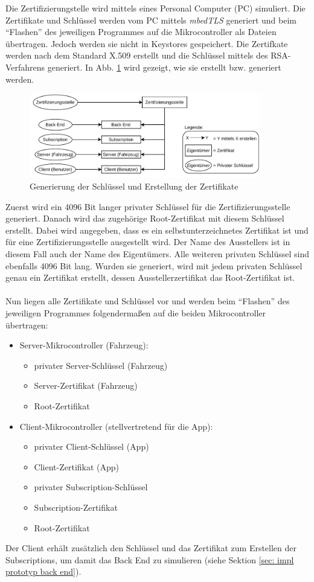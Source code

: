 Die Zertifizierungstelle wird mittels eines Personal Computer (PC) simuliert. Die Zertifikate und Schlüssel werden vom PC mittels \textit{mbedTLS} generiert und beim "`Flashen"' des jeweiligen Programmes auf die Mikrocontroller als Dateien übertragen. Jedoch werden sie nicht in Keystores gespeichert. Die Zertifkate werden nach dem Standard X.509 erstellt und die Schlüssel mittels des RSA-Verfahrens generiert. In Abb. \ref{fig: impl certs keys} wird gezeigt, wie sie erstellt bzw. generiert werden.
\begin{figure}[H]
    \centering
    \includegraphics[width=0.9\textwidth]{graphics/impl_keys_certs.pdf}
    \caption[Generierung der Schlüssel und Erstellung der Zertifikate]{Generierung der Schlüssel und Erstellung der Zertifikate}
    \label{fig: impl certs keys}
\end{figure}
Zuerst wird ein 4096 Bit langer privater Schlüssel für die Zertifizierungsstelle generiert. Danach wird das zugehörige Root-Zertifikat mit diesem Schlüssel erstellt. Dabei wird angegeben, dass es ein selbstunterzeichnetes Zertifikat ist und für eine Zertifizierungsstelle ausgestellt wird. Der Name des Ausstellers ist in diesem Fall auch der Name des Eigentümers. Alle weiteren privaten Schlüssel sind ebenfalls 4096 Bit lang. Wurden sie generiert, wird mit jedem privaten Schlüssel genau ein Zertifikat erstellt, dessen Ausstellerzertifikat das Root-Zertifikat ist.
\\\\
Nun liegen alle Zertifikate und Schlüssel vor und werden beim "`Flashen"' des jeweiligen Programmes folgendermaßen auf die beiden Mikrocontroller übertragen:
\begin{itemize}
    \item Server-Mikrocontroller (Fahrzeug):
    \begin{itemize}
        \item privater Server-Schlüssel (Fahrzeug)
        \item Server-Zertifikat (Fahrzeug)
        \item Root-Zertifikat
    \end{itemize}
    \item Client-Mikrocontroller (stellvertretend für die App):
    \begin{itemize}
        \item privater Client-Schlüssel (App)
        \item Client-Zertifikat (App)
        \item privater Subscription-Schlüssel
        \item Subscription-Zertifikat
        \item Root-Zertifikat
    \end{itemize}
\end{itemize}
Der Client erhält zusätzlich den Schlüssel und das Zertifikat zum Erstellen der Subscriptions, um damit das Back End zu simulieren (siehe Sektion \ref{sec: impl prototyp back end}).